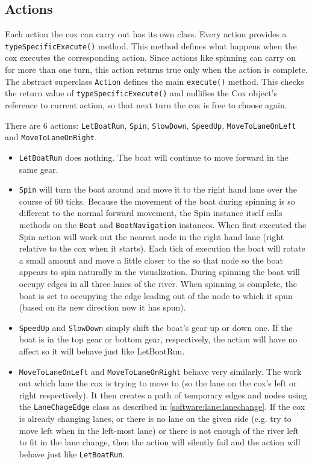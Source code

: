 \subsection{Actions}
  Each action the cox can carry out has its own class. Every action provides a \texttt{typeSpecificExecute()} method. This method defines what happens when the cox executes the corresponding action. Since actions like spinning can carry on for more than one turn, this action returns true only when the action is complete. The abstract superclass \texttt{Action} defines the main \texttt{execute()} method. This checks the return value of \texttt{typeSpecificExecute()} and nullifies the Cox object's reference to current action, so that next turn the cox is free to choose again.

  There are 6 actions: \texttt{LetBoatRun}, \texttt{Spin}, \texttt{SlowDown}, \texttt{SpeedUp}, \texttt{MoveToLaneOnLeft} and \texttt{MoveToLaneOnRight}.
  
  \begin{itemize}
  
    \item \texttt{LetBoatRun} does nothing. The boat will continue to move forward in the same gear.
  
    \item \texttt{Spin} will turn the boat around and move it to the right hand lane over the course of 60 ticks. Because the movement of the boat during spinning is so different to the normal forward movement, the Spin instance itself calls methods on the \texttt{Boat} and \texttt{BoatNavigation} instances. When first executed the Spin action will work out the nearest node in the right hand lane (right relative to the cox when it starts). Each tick of execution the boat will rotate a small amount and move a little closer to the so that node so the boat appears to spin naturally in the visualization. During spinning the boat will occupy edges in all three lanes of the river. When spinning is complete, the boat is set to occupying the edge leading out of the node to which it spun (based on its new direction now it has spun).
  
    \item \texttt{SpeedUp} and \texttt{SlowDown} simply shift the boat's gear up or down one. If the boat is in the top gear or bottom gear, respectively, the action will have no affect so it will behave just like LetBoatRun.
  
    \item \texttt{MoveToLaneOnLeft} and \texttt{MoveToLaneOnRight} behave very similarly. The work out which lane the cox is trying to move to (so the lane on the cox's left or right respectively). It then creates a path of temporary edges and nodes using the \texttt{LaneChageEdge} class as described in \ref{software:lane:lanechange}. If the cox is already changing lanes, or there is no lane on the given side (e.g. try to move left when in the left-most lane) or there is not enough of the river left to fit in the lane change, then the action will silently fail and the action will behave just like \texttt{LetBoatRun}.
  \end{itemize}
